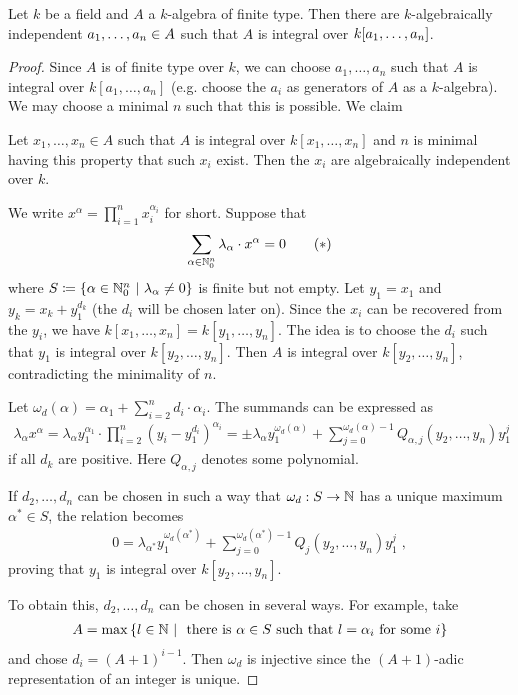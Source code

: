 \documentclass[a4paper,parskip=half,numbers=enddot, DIV=12]{scrreprt}
\begin{document}
	\begin{thm}
		Let $k$ be a field and $A$ a $k$-algebra of finite type. Then there are $k$-algebraically independent $a_1,\ldots, a_n\in A$ such that $A$ is integral over $k[a_1,\ldots, a_n]$.
	\end{thm}
	\begin{proof}
		Since $A$ is of finite type over $k$, we can choose $a_1,\ldots, a_n$ such that $A$ is integral over $k[a_1,\ldots, a_n]$ (e.g. choose the $a_i$ as generators of $A$ as a $k$-algebra). We may choose a minimal $n$ such that this is possible. We claim 
		\begin{claim*}
			Let $x_1,\ldots, x_n\in A$ such that $A$ is integral over $k[x_1,\ldots,x_n]$ and $n$ is minimal having this property that such $x_i$ exist. Then the $x_i$ are algebraically independent over $k$.
		\end{claim*}
		We write $x^\alpha = \prod_{i=1}^n x_i^{\alpha_i}$ for short. Suppose that
		\begin{align*}
		\sum_{\alpha\in\IN_0^n} \lambda_\alpha \cdot x^\alpha =0\lbl{eq:1.5.1a}\tag{$*$}
		\end{align*}
		where  $S\coloneqq \left\{\alpha\in\mathbb{N}_0^n\ \middle|\ \lambda_\alpha\neq 0\right\}$ is finite but not empty. Let $y_1=x_1$ and $y_k = x_k +y_1^{d_k}$ (the $d_i$ will be chosen later on). Since the $x_i$ can be recovered from the $y_i$, we have $k[x_1,\ldots,x_n] = k[y_1,\ldots,y_n]$. The idea is to choose the $d_i$ such that $y_1$ is integral over $k[y_2,\ldots,y_n]$. Then $A$ is integral over $k[y_2,\ldots,y_n]$, contradicting the minimality of $n$. 
		
		Let $\omega_d(\alpha) =\alpha_1 +\sum_{i=2}^nd_i\cdot \alpha_i$. The summands can be expressed as 
		\begin{align*}
		\lambda_\alpha x^\alpha = \lambda_\alpha y_1^{\alpha_1} \cdot\prod_{i=2}^n \left(y_i - y_1^{d_i}\right)^{\alpha_i}= \pm \lambda_\alpha y_1^{\omega_d(\alpha)} + \sum_{j=0}^{\omega_d(\alpha)-1} Q_{\alpha,j}(y_2,\ldots, y_n) y_1^j
		\end{align*}
		if all $d_k$ are positive. Here $Q_{\alpha, j}$ denotes some polynomial. 
		
		If $d_2,\ldots, d_n$ can be chosen in such a way that $\omega_d: S\to \mathbb{N}$ has a unique maximum $\alpha^\ast \in S$, the relation  becomes
		\begin{align*}
		0 = \lambda_{\alpha^\ast} y_1^{\omega_d(\alpha^\ast)} +\sum_{j=0}^{\omega_d(\alpha^\ast)-1} Q_j(y_2,\ldots,y_n)y_1^j\;,
		\end{align*}
		proving that $y_1$ is integral over $k[y_2,\ldots,y_n]$. 
		
		To obtain this, $d_2,\ldots,d_n$ can be chosen in several ways. For example, take
		\begin{align*}
		A = \max\left\{l\in\mathbb{N}\ \middle|\ \text{ there is }\alpha\in S \text{ such that } l =\alpha_i \text{ for some } i\right\}
		\end{align*}
		and chose $d_i = (A+1)^{i-1}$. Then $\omega_d$ is injective since the $(A+1)$-adic representation of an integer is unique.
	\end{proof}
	
\end{document}

